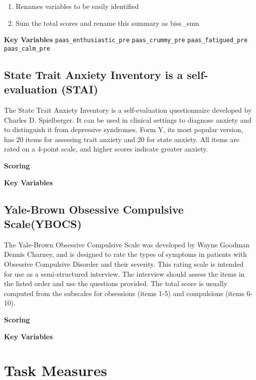 \documentclass[
]{book}
\begin{document}
\begin{enumerate}
\def\labelenumi{\arabic{enumi}.}
\setcounter{enumi}{1}
\item
  Renames variables to be easily identified
\item
  Sum the total scores and rename this summary as biss\_sum
\end{enumerate}

\textbf{Key Variables} \texttt{paas\_enthusiastic\_pre} \texttt{paas\_crummy\_pre}
\texttt{paas\_fatigued\_pre} \texttt{paas\_calm\_pre}

\section{State Trait Anxiety Inventory is a self-evaluation (STAI)}\label{state-trait-anxiety-inventory-is-a-self-evaluation-stai}

The State Trait Anxiety Inventory is a self-evaluation questionnaire
developed by Charles D. Spielberger. It can be used in clinical settings
to diagnose anxiety and to distinguish it from depressive syndromes.
Form Y, its most popular version, has 20 items for assessing trait
anxiety and 20 for state anxiety. All items are rated on a 4-point
scale, and higher scores indicate greater anxiety.

\textbf{Scoring}

\textbf{Key Variables}

\section{Yale-Brown Obsessive Compulsive Scale(YBOCS)}\label{yale-brown-obsessive-compulsive-scaleybocs}

The Yale-Brown Obsessive Compulsive Scale was developed by Wayne Goodman
Dennis Charney, and is designed to rate the types of symptoms in
patients with Obsessive Compulsive Disorder and their severity. This
rating scale is intended for use as a semi-structured interview. The
interview should assess the items in the listed order and use the
questions provided. The total score is usually computed from the
subscales for obsessions (items 1-5) and compulsions (items 6-10).

\textbf{Scoring}

\textbf{Key Variables}

\chapter{Task Measures}\label{task-measures}
\end{document}
